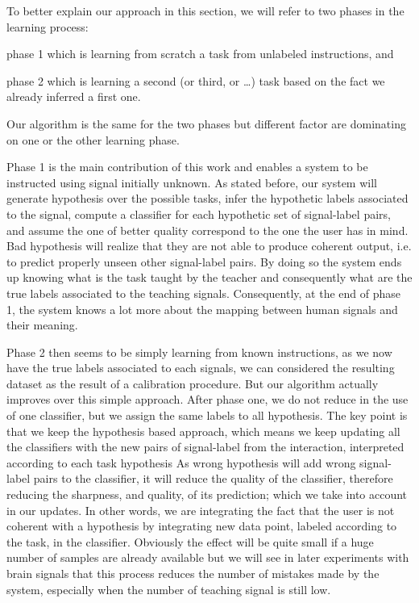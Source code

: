 To better explain our approach in this section, we will refer to two phases in the learning process: \begin{inparaenum}[a)] \item phase 1 which is learning from scratch a task from unlabeled instructions, and \item phase 2 which is learning a second (or third, or \ldots) task based on the fact we already inferred a first one. \end{inparaenum} Our algorithm is the same for the two phases but different factor are dominating on one or the other learning phase.

Phase 1 is the main contribution of this work and enables a system to be instructed using signal initially unknown. As stated before, our system will generate hypothesis over the possible tasks, infer the hypothetic labels associated to the signal, compute a classifier for each hypothetic set of signal-label pairs, and assume the one of better quality correspond to the one the user has in mind. Bad hypothesis will realize that they are not able to produce coherent output, i.e. to predict properly unseen other signal-label pairs. By doing so the system ends up knowing what is the task taught by the teacher and consequently what are the true labels associated to the teaching signals. Consequently, at the end of phase 1, the system knows a lot more about the mapping between human signals and their meaning.

Phase 2 then seems to be simply learning from known instructions, as we now have the true labels associated to each signals, we can considered the resulting dataset as the result of a calibration procedure. But our algorithm actually improves over this simple approach. After phase one, we do not reduce in the use of one classifier, but we assign the same labels to all hypothesis. The key point is that we keep the hypothesis based approach, which means we keep updating all the classifiers with the new pairs of signal-label from the interaction, interpreted according to each task hypothesis As wrong hypothesis will add wrong signal-label pairs to the classifier, it will reduce the quality of the classifier, therefore reducing the sharpness, and quality, of its prediction; which we take into account in our updates. In other words, we are integrating the fact that the user is not coherent with a hypothesis by integrating new data point, labeled according to the task, in the classifier. Obviously the effect will be quite small if a huge number of samples are already available but we will see in later experiments with brain signals that this process reduces the number of mistakes made by the system, especially when the number of teaching signal is still low.

